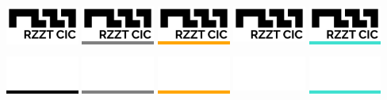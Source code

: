 \documentclass[a4paper,10pt]{article}
\begin{document}
\colorbox{White}{\includegraphics[width=0.18\textwidth]{logo-black.png}}\hspace{\fill}%
\colorbox{Grey}{\includegraphics[width=0.18\textwidth]{logo-black.png}}\hspace{\fill}%
\colorbox{Orange}{\includegraphics[width=0.18\textwidth]{logo-black.png}}\hspace{\fill}%
\colorbox{Amber}{\includegraphics[width=0.18\textwidth]{logo-black.png}}\hspace{\fill}%
\colorbox{Turquoise}{\includegraphics[width=0.18\textwidth]{logo-black.png}}%

\setlength{\parskip}{0.005\textwidth}

\colorbox{Black}{\includegraphics[width=0.18\textwidth]{logo-white.png}}\hspace{\fill}%
\colorbox{Grey}{\includegraphics[width=0.18\textwidth]{logo-white.png}}\hspace{\fill}%
\colorbox{Orange}{\includegraphics[width=0.18\textwidth]{logo-white.png}}\hspace{\fill}%
\colorbox{Amber}{\includegraphics[width=0.18\textwidth]{logo-white.png}}\hspace{\fill}%
\colorbox{Turquoise}{\includegraphics[width=0.18\textwidth]{logo-white.png}}%
\end{document}
